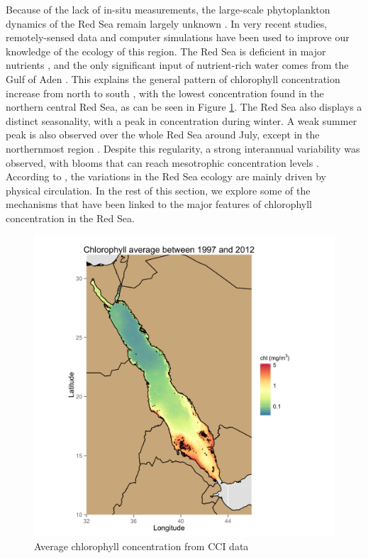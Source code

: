 Because of the lack of in-situ measurements, the large-scale phytoplankton
dynamics of the Red Sea remain largely unknown \citep{Raitsos2013,
Triantafyllou2014}. In very recent studies, remotely-sensed data and computer
simulations have been used to improve our knowledge of the ecology of this
region. The Red Sea is deficient in major nutrients \citep{Weikert1987}, and
the only significant input of nutrient-rich water comes from the Gulf of Aden
\citep{Yao2015}. This explains the general pattern of chlorophyll concentration
increase from north to south \citep{Raitsos2013}, with the lowest concentration
found in the northern central Red Sea, as can be seen in Figure \ref{meanchl}.
The Red Sea also displays a distinct seasonality, with a peak in concentration
during winter.  A weak summer peak is also observed over the whole Red Sea
around July, except in the northernmost region \citep{Raitsos2013}. Despite
this regularity, a strong interannual variability was observed, with blooms
that can reach mesotrophic concentration levels \citep{Raitsos2013}. According
to \citet{Triantafyllou2014}, the variations in the Red Sea ecology are mainly
driven by physical circulation. In the rest of this section, we explore some of
the mechanisms that have been linked to the major features of chlorophyll
concentration in the Red Sea.

\begin{figure}[h]
    \centering
    \includegraphics[scale=.15]{figures/chl_average.png}
    \caption{Average chlorophyll concentration from CCI data}
    \label{meanchl}
\end{figure}

